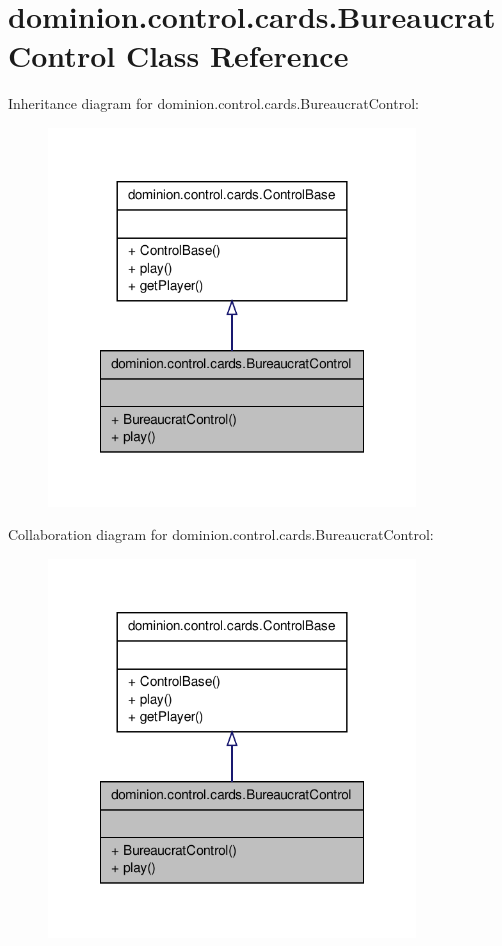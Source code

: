 \hypertarget{classdominion_1_1control_1_1cards_1_1BureaucratControl}{\section{dominion.\-control.\-cards.\-Bureaucrat\-Control \-Class \-Reference}
\label{classdominion_1_1control_1_1cards_1_1BureaucratControl}
}


\-Inheritance diagram for dominion.\-control.\-cards.\-Bureaucrat\-Control\-:
\nopagebreak
\begin{figure}[H]
\begin{center}
\leavevmode
\includegraphics[width=276pt]{classdominion_1_1control_1_1cards_1_1BureaucratControl__inherit__graph}
\end{center}
\end{figure}


\-Collaboration diagram for dominion.\-control.\-cards.\-Bureaucrat\-Control\-:
\nopagebreak
\begin{figure}[H]
\begin{center}
\leavevmode
\includegraphics[width=276pt]{classdominion_1_1control_1_1cards_1_1BureaucratControl__coll__graph}
\end{center}
\end{figure}
